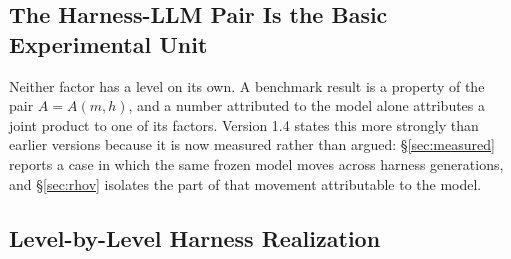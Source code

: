\documentclass[11pt]{article}
\theoremstyle{definition}
\begin{document}
\subsection{The Harness-LLM Pair Is the Basic Experimental Unit}\label{sec:pair}

Neither factor has a level on its own. A benchmark result is a property of the pair $A = A(m,h)$, and a number attributed to the model alone attributes a joint product to one of its factors. Version 1.4 states this more strongly than earlier versions because it is now measured rather than argued: \S\ref{sec:measured} reports a case in which the same frozen model moves across harness generations, and \S\ref{sec:rhov} isolates the part of that movement attributable to the model.

\subsection{Level-by-Level Harness Realization}
\end{document}
